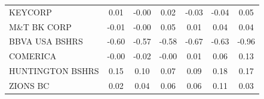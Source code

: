 \documentclass[11pt]{article}
\begin{document}
\begin{table}
\begin{tabular}{|l|c|c|c|c|c|c|}
KEYCORP               &0.01&-0.00&0.02&-0.03&-0.04&0.05\\   
M\&T BK CORP          &-0.01&-0.00&0.05&0.01&0.04&0.04\\    
BBVA USA BSHRS        &-0.60&-0.57&-0.58&-0.67&-0.63&-0.96\\
COMERICA              &-0.00&-0.02&-0.00&0.01&0.06&0.13\\   
HUNTINGTON BSHRS      &0.15&0.10&0.07&0.09&0.18&0.17\\      
ZIONS BC              &0.02&0.04&0.06&0.06&0.11&0.03\\      
\hline                                                      
\end{tabular}                                               
\end{table}                                                 
\end{document}
